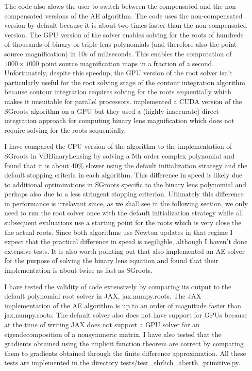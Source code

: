 \documentclass[12pt,dvipsnames]{report}
\newcommand{\ssf}[1]{\textsf{#1}}
\begin{document}
The code also alows the user to switch between the compensated  and the non-compensated 
versions of the AE algorithm. The code uses the non-compensated version by default because 
it is about two times faster than the non-compensated version. The GPU version of the 
solver enables solving for the roots of hundreds of thousands of binary or triple lens 
polynomials (and therefore also the point source magnification) in 10s of miliseconds.  
This enables the computation of $1000 \times 1000$ point source magnification maps 
in a fraction of a second. Unfortunately, despite this speedup, the GPU version of the 
root solver isn't particularly useful for the root solving stage of the contour integration 
algorithm because  contour integration requires solving for the roots sequentially 
which makes it unsuitable for parallel processors.
\citet{mcdougall2014} implemented a \ssf{CUDA} version of the \ssf{SGroots} algorithm 
on a GPU but they used  a (highly inaccurate) direct integration approach for 
computing binary lens magnification which does not require solving for the roots 
sequentially. 

I have compared the CPU version of the algorithm to the implementation of \ssf{SGroots} 
in \ssf{VBBinaryLensing} by solving a 5th order complex polynomial and found that 
it is about 40\% slower using the default initialization strategy and the default 
stopping criteria in each algorithm. This difference in speed is likely due to additional 
optimizations in \ssf{SGroots} specific to the binary lens polynomial and perhaps also due 
to  a less stringent stopping criterion. Ultimately this difference in performance is 
irrelavant since, as we shall see in the following section, we only need to run the 
root solver once  with the default initialization strategy while all subsequent evaluations 
use a starting  point for the roots which is very close the the actual roots. 
Since both algorithms use Newton updates in that regime I expect that the practical 
difference in speed is negiligble, although I haven't done extensive tests. It is also 
worth pointing out that \citet{2022MNRAS.514.4379F} also implemented an AE solver for 
the purpose of solving the binary lens equation and found that their implementation 
is about twice as fast as \ssf{SGroots}. 

I have tested the validity of code extensively by comparing its output to the 
default polynomial root solver in \ssf{JAX}, \ssf{jax.numpy.roots}. The \ssf{JAX} 
implementation of the AE algorithm is up to an order of magnitude faster than 
\ssf{jax.numpy.roots}. The default solver also does not have support for GPUs because 
at the time of writing \ssf{JAX} does not support a GPU solver for an eigendecomposition 
of a nonsymmeric matrix.
I have also tested that the gradients obtained using the implicit function theorem are 
correct by comparing them to gradients obtained through the finite 
difference approximation. All these tests are implemented in the directory
\ssf{tests/test\_ehrlich\_aberth\_primitive.py}.
\end{document}
